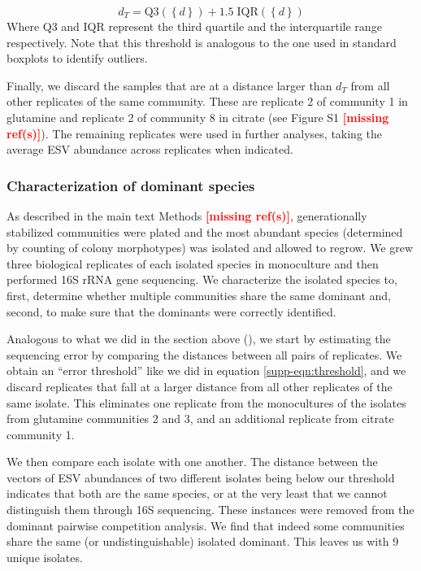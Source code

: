 \documentclass[a4paper,10pt]{article}
\newcommand{\mr}{\textcolor{red}{\textbf{[missing ref(s)]}}}
\begin{document}
\begin{equation}
d_T = \mathrm{Q}3 \left( \left\{d\right\} \right) + 
1.5 \; \mathrm{IQR} \left( \left\{d\right\} \right)
\label{supp-eqn:threshold}
\end{equation}
%
Where Q3 and IQR represent the third quartile and the interquartile range
respectively. Note that this threshold is analogous to the one used in
standard boxplots to identify outliers.

Finally, we discard the samples that are at a distance larger than $d_T$ from
all other replicates of the same community. These are replicate 2 of community
1 in glutamine and replicate 2 of community 8 in citrate (see Figure S1 \mr).
The remaining replicates were used in further analyses, taking the average
ESV abundance across replicates when indicated.

\subsubsection{Characterization of dominant species}
\label{supp-methods:data-proc:doms}

As described in the main text Methods \mr, generationally stabilized communities
were plated and the most abundant species
(determined by counting of colony morphotypes) was isolated
and allowed to regrow. We grew three biological
replicates of each isolated species in monoculture and then performed
16S rRNA gene sequencing. We characterize
the isolated species to, first,
determine whether multiple communities share the same dominant
and, second, to
make sure that the dominants were correctly identified.

Analogous to what we did in the section above
(), we start by estimating
the sequencing error by comparing the distances between all pairs of replicates.
We obtain an ``error threshold'' like we did in equation \ref{supp-eqn:threshold},
and we discard replicates that fall at a larger distance
from all other replicates of the same isolate. This eliminates one replicate
from the monocultures of the isolates from glutamine communities 2 and 3, and
an additional replicate from citrate community 1.

We then compare each isolate with
one another. The distance between the vectors of ESV abundances of two
different isolates being below our threshold indicates that both
are the same species, or at the very least that we cannot
distinguish them through 16S sequencing. These instances were removed from 
the dominant pairwise competition analysis. We find that indeed some
communities share
the same (or undistinguishable) isolated dominant. This leaves us with 9 unique
isolates.
\end{document}
